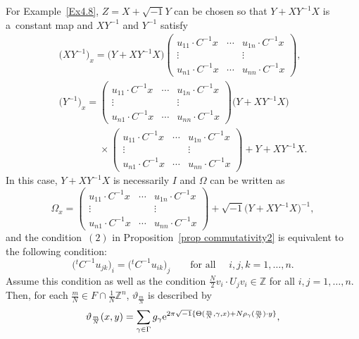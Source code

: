 \documentclass[pdftex]{sigma}
\numberwithin{equation}{section}
\newcommand{\Z}{\mathbb{Z}}
\begin{document}
\begin{Example}\label{EX4.8-2}
For Example~\ref{Ex4.8}, $Z=X+\sqrt{-1}Y$ can be chosen so that $Y+XY^{-1}X$ is a~constant map and $XY^{-1}$ and $Y^{-1}$ satisfy
\begin{gather*}
\bigl(XY^{-1}\bigr)_x=\bigl(Y+XY^{-1}X\bigr)
\begin{pmatrix}
u_{11}\cdot C^{-1}x & \cdots & u_{1n}\cdot C^{-1}x \\
\vdots & & \vdots \\
u_{n1}\cdot C^{-1}x & \cdots & u_{nn}\cdot C^{-1}x
\end{pmatrix}, \\
\bigl(Y^{-1}\bigr)_x=
\begin{pmatrix}
u_{11}\cdot C^{-1}x & \cdots & u_{1n}\cdot C^{-1}x \\
\vdots & & \vdots \\
u_{n1}\cdot C^{-1}x & \cdots & u_{nn}\cdot C^{-1}x
\end{pmatrix}
\bigl(Y+XY^{-1}X\bigr)\\
\phantom{\bigl(Y^{-1}\bigr)_x=}{}\times
\begin{pmatrix}
u_{11}\cdot C^{-1}x & \cdots & u_{1n}\cdot C^{-1}x \\
\vdots & & \vdots \\
u_{n1}\cdot C^{-1}x & \cdots & u_{nn}\cdot C^{-1}x
\end{pmatrix}+Y+XY^{-1}X.
\end{gather*}
In this case, $Y+XY^{-1}X$ is necessarily $I$ and $\Omega$ can be written as
\[
\Omega_x=
\begin{pmatrix}
u_{11}\cdot C^{-1}x & \cdots & u_{1n}\cdot C^{-1}x \\
\vdots & & \vdots \\
u_{n1}\cdot C^{-1}x & \cdots & u_{nn}\cdot C^{-1}x
\end{pmatrix}
+\sqrt{-1}\bigl(Y+XY^{-1}X\bigr)^{-1},
\]
and the condition~$(2)$ in Proposition~\ref{prop commutativity2} is equivalent to the following condition:
\begin{equation*}
\bigl({}^tC^{-1}u_{jk}\bigr)_i=\bigl({}^tC^{-1}u_{ik}\bigr)_j\qquad \text{for all }\quad i, j, k=1,\ldots , n.
\end{equation*}
Assume this condition as well as the condition $\frac{N}{2}v_i\cdot U_jv_i\in \Z$ for all $i, j=1,\ldots , n$. Then, for each $\frac{m}{N}\in F\cap \frac{1}{N}\Z^n$, $\vartheta_{\frac{m}{N}}$ is described by
\begin{align*}
\vartheta_{\frac{m}{N}}(x,y)=\sum_{\gamma \in \Gamma}g_\gamma {\rm e}^{2\pi\sqrt{-1}\{\Theta (\frac{m}{N}, \gamma, x)+N\rho_\gamma (\frac{m}{N})\cdot y\}},

\end{align*}
\end{Example}
\end{document}
